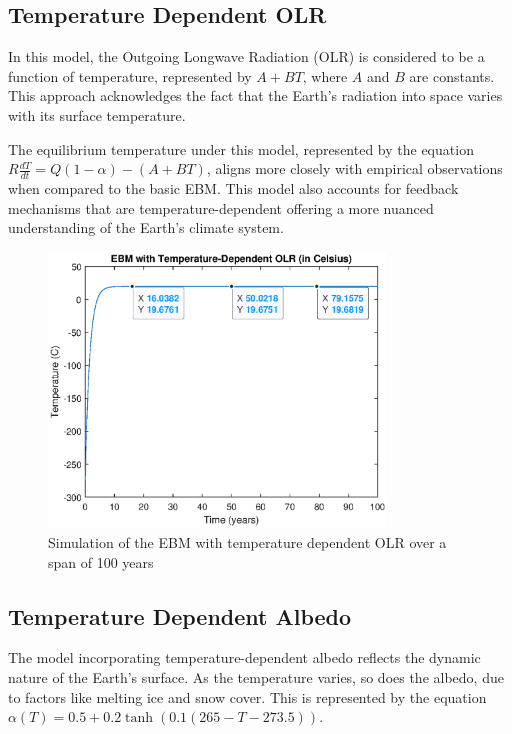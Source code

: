 \documentclass[12pt]{article}
\begin{document}
\subsection{Temperature Dependent OLR}
In this model, the Outgoing Longwave Radiation (OLR) is considered to be a function of temperature, represented by \( A + BT \), where \( A \) and \( B \) are constants. This approach acknowledges the fact that the Earth's radiation into space varies with its surface temperature\cite{kaper-2013-math-ac-budyko}.

The equilibrium temperature under this model, represented by the equation \( R\frac{dT}{dt} = Q(1 - \alpha) - (A + BT) \), aligns more closely with empirical observations when compared to the basic EBM. This model also accounts for feedback mechanisms that are temperature-dependent offering a more nuanced understanding of the Earth's climate system.

\begin{figure}[H]
    \centering
    \includegraphics[width=0.8\textwidth]{images/temperature_dependent_olr.eps}
    \caption{Simulation of the EBM with temperature dependent OLR over a span of 100 years}
    \label{fig:ebm_temperature_olr}
\end{figure}

\subsection{Temperature Dependent Albedo}
The model incorporating temperature-dependent albedo
reflects the dynamic nature of the Earth's surface.
As the temperature varies, so does the albedo,
due to factors like melting ice and snow cover.
This is represented by the equation
\( \alpha(T) = 0.5 + 0.2 \tanh(0.1(265 - T - 273.5)) \).
\end{document}
